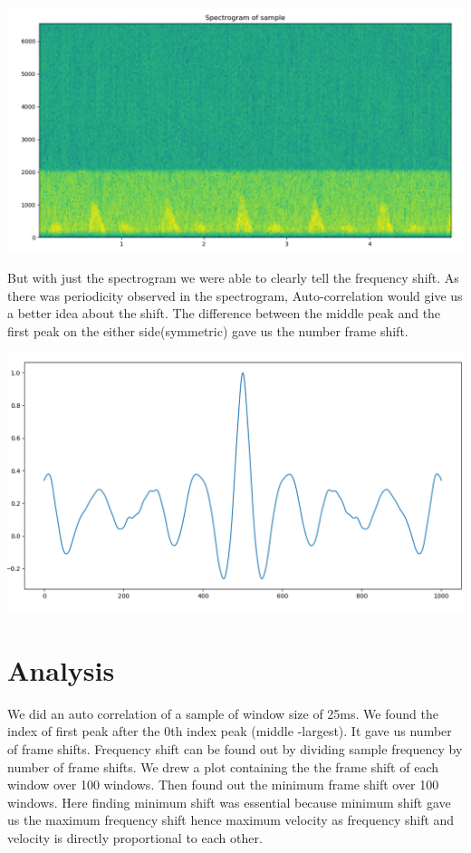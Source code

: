 \documentclass[BTech]{nitkdiss}
\begin{document}
\begin{center}
\includegraphics[scale = 0.4]{spec.png}
\end{center}

\hspace{0.4cm} But with just the spectrogram we were able to clearly tell the frequency shift. As there was periodicity observed in the spectrogram, Auto-correlation would give us a better idea about the shift.
The difference between the middle peak and the first peak on the either side(symmetric) gave us the number frame shift.

\begin{center}
\includegraphics[scale = 0.33]{auto1.png}
\end{center}
 

\section{Analysis}
\hspace{0.4cm} We did an auto correlation of a sample of window size of 25ms. We found the index of first peak after the 0th index peak (middle -largest). It gave us number of frame shifts. Frequency shift can be found out by dividing sample frequency by number of frame shifts. We drew a plot containing the the frame shift of each window over 100 windows. Then found out the minimum frame shift over 100 windows. Here finding minimum shift was essential because minimum shift gave us the maximum frequency shift hence maximum velocity as frequency shift and velocity is directly proportional to each other.
\end{document}
